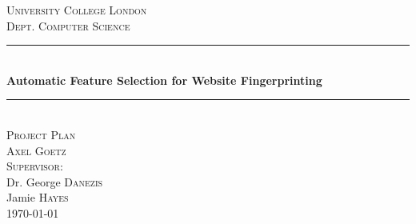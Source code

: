 \newcommand{\HRule}{\rule{\linewidth}{0.5mm}}

\begin{center}
  \textsc{\LARGE University College London}\\[0.5cm]
  \textsc{\Large Dept. Computer Science}\\[0.5cm]

  \HRule \\ [0.4cm]
  { \Large \bfseries Automatic Feature Selection for Website Fingerprinting}\\[0.3cm]
  \HRule \\ [0.4cm]

  \textsc{\LARGE Project Plan}\\[0.5cm]

  \textsc{\Large Axel Goetz}\\[0.5cm]
  \textsc{\large Supervisor:}\\[0.1cm]
  \normalsize Dr. George \textsc{Danezis}\\
  \normalsize Jamie \textsc{Hayes}\\
  \vspace{0.2cm}
  \today

\end{center}
